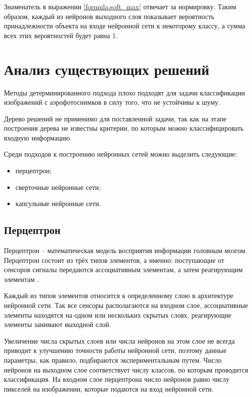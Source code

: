 Знаменатель в выражении \ref{formula:soft_max} отвечает за нормировку. Таким образом, каждый из нейронов выходного слоя показывает вероятность принадлежности объекта на входе нейронной сети к некоторому классу, а сумма всех этих вероятностей будет равна 1.

\chapter{Анализ существующих решений}
Методы детерминированного подхода плохо подходят для задачи классификации изображений с аэрофотоснимков в силу того, что не устойчивы к шуму.

Дерево решений не применимо для поставленной задачи, так как на этапе построения дерева не известны критерии, по которым можно классифицировать входную информацию.

Среди подходов к построению нейронных сетей можно выделить следующие:
\begin{itemize}
	\item перцептрон;
	\item сверточные нейронные сети;
	\item капсульные нейронные сети.
\end{itemize}

\section{Перцептрон}
Перцептрон – математическая модель восприятия информации головным мозгом. Перцептрон состоит из трёх типов элементов, а именно: поступающие от сенсоров сигналы передаются ассоциативным элементам, а затем реагирующим элементам \cite{perceptron}.

Каждый из типов элементов относится к определенному слою в архитектуре нейронной сети. Так все сенсоры располагаются на входном слое, ассоциативные элементы находятся на одном или нескольких скрытых слоях, реагирующие элементы занимают выходной слой.



Увеличение числа скрытых слоев или числа нейронов на этом слое не всегда приводит к улучшению точности работы нейронной сети, поэтому данные параметры, как правило, подбираются экспериментальным путем. Число нейронов на выходном слое соответствует числу классов, по которым проводится классификация. На входном слое перцептрона число нейронов равно числу пикселей на изображении, которые подаются на вход нейронной сети.

